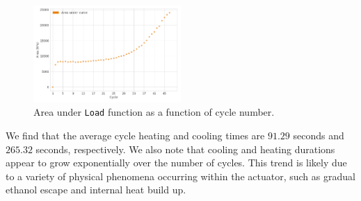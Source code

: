 \documentclass[letterpaper, 10 pt, conference]{ieeeconf}  %
\begin{document}
\label{area}
\begin{figure}[h]
	\centering
  \includegraphics[width=0.5\textwidth]{assets/area.png}
    \caption{Area under \texttt{Load} function as a function of cycle number.}
\end{figure}

%


%
%

We find that the average cycle heating and cooling times are $91.29$ seconds and $265.32$ seconds, respectively. We also note that cooling and heating durations appear to grow exponentially over the number of cycles. This trend is likely due to a variety of physical phenomena occurring within the actuator, such as gradual ethanol escape and internal heat build up.
\end{document}
